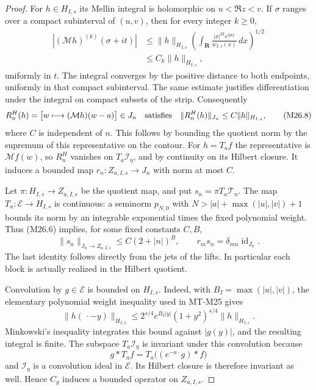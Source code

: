 \documentclass[11pt,a4paper]{article}
\begin{document}
\begin{proof}
For $h\in H_{I,s}$ its Mellin integral is holomorphic on
$u<\Re z<v$. If $\sigma$ ranges over a compact subinterval
of $(u,v)$, then for every integer $k\ge0$,
\[
 \begin{split}
 |(\mathcal Mh)^{(k)}(\sigma+it)|
 &\le\|h\|_{H_{I,s}}
   \left(\int_{\mathbf R}
     \frac{|x|^{2k}e^{2\sigma x}}{w_{I,s}(x)}\,dx\right)^{1/2}\\
 &\le C_k\|h\|_{H_{I,s}},
 \end{split}                                                    \tag{M26.7}
\]
uniformly in $t$. The integral converges by the positive
distance to both endpoints, uniformly in that compact
subinterval. The same estimate justifies differentiation
under the integral on compact subsets of the strip.
Consequently
\[
 R_n^H(h)=\bigl[w\longmapsto(\mathcal Mh)(w-a)\bigr]\in J_n
 \quad\hbox{satisfies}\quad
       \|R_n^H(h)\|_{J_n}\le C\|h\|_{H_{I,s}},
                                                               \tag{M26.8}
\]
where $C$ is independent of $n$. This follows by bounding
the quotient norm by the supremum of this representative
on the contour. For $h=T_af$ the representative is
$\mathcal Mf(w)$, so $R_n^H$ vanishes on $T_a\mathcal I_\eta$,
and by continuity on its Hilbert closure. It induces a
bounded map $r_n:Z_{a,I,s}\to J_n$ with norm at most $C$.

Let $\pi:H_{I,s}\to Z_{a,I,s}$ be the quotient map, and put
$s_n=\pi T_a\mathcal T_n$. The map $T_a:\mathcal E\to H_{I,s}$
is continuous: a seminorm $p_{N,0}$ with
$N>|a|+\max(|u|,|v|)+1$ bounds its norm by an integrable
exponential times the fixed polynomial weight. Thus (M26.6)
implies, for some fixed constants $C,B$,
\[
 \|s_n\|_{J_n\to Z_{a,I,s}}\le C(2+|n|)^B,
 \qquad r_m s_n=\delta_{mn}\operatorname{id}_{J_n}.
                                                               \tag{M26.9}
\]
The last identity follows directly from the jets of the
lifts. In particular each block is actually realized in
the Hilbert quotient.

Convolution by $g\in\mathcal E$ is bounded on $H_{I,s}$.
Indeed, with $B_I=\max(|u|,|v|)$, the elementary polynomial
weight inequality used in MT-M25 gives
\[
 \|h(\,\cdot-y)\|_{H_{I,s}}
 \le2^{s/4}e^{B_I|y|}(1+y^2)^{s/4}\|h\|_{H_{I,s}}.
                                                               \tag{M26.10}
\]
Minkowski's inequality integrates this bound against
$|g(y)|$, and the resulting integral is finite.
The subspace $T_a\mathcal I_\eta$ is invariant under this
convolution because
\[
           g*T_af=T_a\bigl((e^{-a\cdot}g)*f\bigr)
                                                               \tag{M26.11}
\]
and $\mathcal I_\eta$ is a convolution ideal in $\mathcal E$.
Its Hilbert closure is therefore invariant as well. Hence
$C_g$ induces a bounded operator on $Z_{a,I,s}$.


\end{proof}
\end{document}

